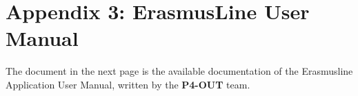 \chapter{Appendix 3: ErasmusLine User Manual}
The document in the next page is the available documentation of the Erasmusline
Application User Manual, written by the \textbf{P4-OUT} team.

